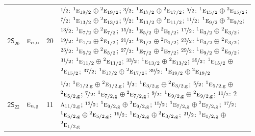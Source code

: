 \documentclass[10pt,a4paper]{article}
\numberwithin{equation}{section}
\newcommand{\grp}[1]{\mathsf{#1}}
\newcommand{\irr}[1]{\text{\normalfont\scshape #1}}
\newcommand{\conjpair}[1]{{}^{#1}}
\newcommand{\ptag}[1]{\mathrm{#1}}
\newlength{\fillwidth}\newlength{\cellwidth}\newlength{\colwidth}
\begin{document}
{\begin{longtable}{@{}llr>{\RaggedRight\arraybackslash}p{\fillwidth}@{}}
\href{2S20.pdf}{$\grp{2S_{20}}$} & $\irr{e}_{n,\ptag{u}}$ & 20 & $\nicefrac{1}{2}$: $\conjpair{1}\irr{e}_{19/2}$${}\oplus{}$$\conjpair{2}\irr{e}_{19/2}$; $\nicefrac{3}{2}$: $\conjpair{1}\irr{e}_{17/2}$${}\oplus{}$$\conjpair{2}\irr{e}_{17/2}$; $\nicefrac{5}{2}$: $\conjpair{1}\irr{e}_{15/2}$${}\oplus{}$$\conjpair{2}\irr{e}_{15/2}$; $\nicefrac{7}{2}$: $\conjpair{1}\irr{e}_{13/2}$${}\oplus{}$$\conjpair{2}\irr{e}_{13/2}$; $\nicefrac{9}{2}$: $\conjpair{1}\irr{e}_{11/2}$${}\oplus{}$$\conjpair{2}\irr{e}_{11/2}$; $\nicefrac{11}{2}$: $\conjpair{1}\irr{e}_{9/2}$${}\oplus{}$$\conjpair{2}\irr{e}_{9/2}$; $\nicefrac{13}{2}$: $\conjpair{1}\irr{e}_{7/2}$${}\oplus{}$$\conjpair{2}\irr{e}_{7/2}$; $\nicefrac{15}{2}$: $\conjpair{1}\irr{e}_{5/2}$${}\oplus{}$$\conjpair{2}\irr{e}_{5/2}$; $\nicefrac{17}{2}$: $\conjpair{1}\irr{e}_{3/2}$${}\oplus{}$$\conjpair{2}\irr{e}_{3/2}$; $\nicefrac{19}{2}$: $\conjpair{1}\irr{e}_{1/2}$${}\oplus{}$$\conjpair{2}\irr{e}_{1/2}$; $\nicefrac{21}{2}$: $\conjpair{1}\irr{e}_{1/2}$${}\oplus{}$$\conjpair{2}\irr{e}_{1/2}$; $\nicefrac{23}{2}$: $\conjpair{1}\irr{e}_{3/2}$${}\oplus{}$$\conjpair{2}\irr{e}_{3/2}$; $\nicefrac{25}{2}$: $\conjpair{1}\irr{e}_{5/2}$${}\oplus{}$$\conjpair{2}\irr{e}_{5/2}$; $\nicefrac{27}{2}$: $\conjpair{1}\irr{e}_{7/2}$${}\oplus{}$$\conjpair{2}\irr{e}_{7/2}$; $\nicefrac{29}{2}$: $\conjpair{1}\irr{e}_{9/2}$${}\oplus{}$$\conjpair{2}\irr{e}_{9/2}$; $\nicefrac{31}{2}$: $\conjpair{1}\irr{e}_{11/2}$${}\oplus{}$$\conjpair{2}\irr{e}_{11/2}$; $\nicefrac{33}{2}$: $\conjpair{1}\irr{e}_{13/2}$${}\oplus{}$$\conjpair{2}\irr{e}_{13/2}$; $\nicefrac{35}{2}$: $\conjpair{1}\irr{e}_{15/2}$${}\oplus{}$$\conjpair{2}\irr{e}_{15/2}$; $\nicefrac{37}{2}$: $\conjpair{1}\irr{e}_{17/2}$${}\oplus{}$$\conjpair{2}\irr{e}_{17/2}$; $\nicefrac{39}{2}$: $\conjpair{1}\irr{e}_{19/2}$${}\oplus{}$$\conjpair{2}\irr{e}_{19/2}$\\
\href{2S22.pdf}{$\grp{2S_{22}}$} & $\irr{e}_{n,\ptag{g}}$ & 11 & $\nicefrac{1}{2}$: $\conjpair{1}\irr{e}_{1/2,\ptag{g}}$${}\oplus{}$$\conjpair{2}\irr{e}_{1/2,\ptag{g}}$; $\nicefrac{3}{2}$: $\conjpair{1}\irr{e}_{3/2,\ptag{g}}$${}\oplus{}$$\conjpair{2}\irr{e}_{3/2,\ptag{g}}$; $\nicefrac{5}{2}$: $\conjpair{1}\irr{e}_{5/2,\ptag{g}}$${}\oplus{}$$\conjpair{2}\irr{e}_{5/2,\ptag{g}}$; $\nicefrac{7}{2}$: $\conjpair{1}\irr{e}_{7/2,\ptag{g}}$${}\oplus{}$$\conjpair{2}\irr{e}_{7/2,\ptag{g}}$; $\nicefrac{9}{2}$: $\conjpair{1}\irr{e}_{9/2,\ptag{g}}$${}\oplus{}$$\conjpair{2}\irr{e}_{9/2,\ptag{g}}$; $\nicefrac{11}{2}$: 2$\irr{a}_{11/2,\ptag{g}}$; $\nicefrac{13}{2}$: $\conjpair{1}\irr{e}_{9/2,\ptag{g}}$${}\oplus{}$$\conjpair{2}\irr{e}_{9/2,\ptag{g}}$; $\nicefrac{15}{2}$: $\conjpair{1}\irr{e}_{7/2,\ptag{g}}$${}\oplus{}$$\conjpair{2}\irr{e}_{7/2,\ptag{g}}$; $\nicefrac{17}{2}$: $\conjpair{1}\irr{e}_{5/2,\ptag{g}}$${}\oplus{}$$\conjpair{2}\irr{e}_{5/2,\ptag{g}}$; $\nicefrac{19}{2}$: $\conjpair{1}\irr{e}_{3/2,\ptag{g}}$${}\oplus{}$$\conjpair{2}\irr{e}_{3/2,\ptag{g}}$; $\nicefrac{21}{2}$: $\conjpair{1}\irr{e}_{1/2,\ptag{g}}$${}\oplus{}$$\conjpair{2}\irr{e}_{1/2,\ptag{g}}$\\

\end{longtable}}
\end{document}

